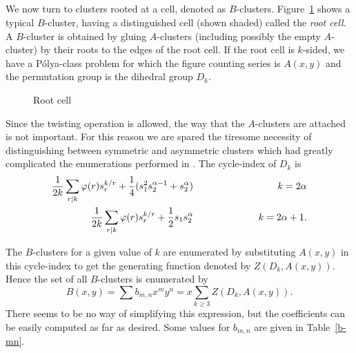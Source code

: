 \documentclass[10pt]{amsart}
\begin{document}

\subsection{}
We now turn to clusters rooted at a cell, denoted as $B$-clusters. Figure~\ref{rootcell} shows a typical $B$-cluster, having a distinguished cell (shown shaded) called the {\em root cell}.  A $B$-cluster is obtained by gluing $A$-clusters (including possibly the empty $A$-cluster) by their roots to the edges of the root cell. If the root cell is $k$-sided, we have a P\'{o}lya-class problem for which the figure counting series is $A(x, y)$ and the permutation
group is the dihedral group $D_k$.

\begin{figure}[h]
    \caption{Root cell}
    \label{rootcell}
    \end{figure}
    
    Since the twisting operation is allowed, the way that the $A$-clusters are attached is not important.  For this reason we are spared the tiresome necessity of distinguishing between symmetric and asymmetric clusters which had greatly complicated the enumerations performed in \cite{r1}. The cycle-index of $D_k$ is
    \begin{eqnarray*}
    \frac{1}{2k}\sum_{r|k}\varphi(r)s_r^{k/r}+ \frac{1}{4}(s_1^2s_2^{\alpha-1}+s_2^\alpha) & \hspace{.8in} & k = 2\alpha \\
    \frac{1}{2k}\sum_{r|k}\varphi(r)s_r^{k/r}+\frac{1}{2}s_1s_2^\alpha & \hspace{.8in} & k = 2\alpha + 1. \\
    \end{eqnarray*}
    
    \vspace{-.2in}
    \noindent The $B$-clusters for a given value of $k$ are enumerated by substituting $A(x, y)$ in this cycle-index to get the generating function denoted by $Z(D_k, A(x,y))$.   Hence the set of all $B$-clusters is enumerated by
    $$B(x, y)  =  \sum b_{m,n} x^m y^n = x \sum_{k\geq 3} Z(D_k, A(x, y)).$$
    There seems to be no way of simplifying this expression, but the coefficients can be easily computed as far as desired.  Some values for $b_{m,n}$ are given in Table~\ref{b-mn}.
    
    
\end{document}
